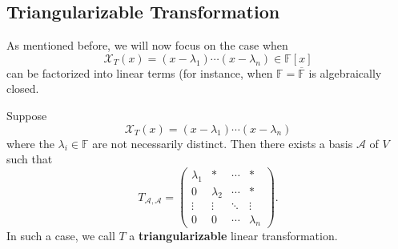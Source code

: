 \subsection{Triangularizable Transformation}
As mentioned before, we will now focus on the case when 
\[
\mathcal{X}_T(x) = (x - \lambda_1) \cdots (x - \lambda_n) \in \mathbb{F}[x]
\]
can be factorized into linear terms (for instance, when $\mathbb{F} = \overline{\mathbb{F}}$ is algebraically closed.
\begin{proposition}\label{prop:upper-triangular-form}
Suppose
\[
\mathcal{X}_T(x) = (x - \lambda_1) \cdots (x - \lambda_n)
\]
where the \( \lambda_i \in \mathbb{F} \) are not necessarily distinct. Then there exists a basis \( \mathcal{A} \) of \( V \) such that
\[
T_{\mathcal{A}, \mathcal{A}} =
\begin{pmatrix}
\lambda_1 & * & \cdots & * \\
0 & \lambda_2 & \cdots & * \\
\vdots & \vdots & \ddots & \vdots \\
0 & 0 & \cdots & \lambda_n
\end{pmatrix}.
\]
In such a case, we call $T$ a {\bf triangularizable} linear transformation.
\end{proposition}

